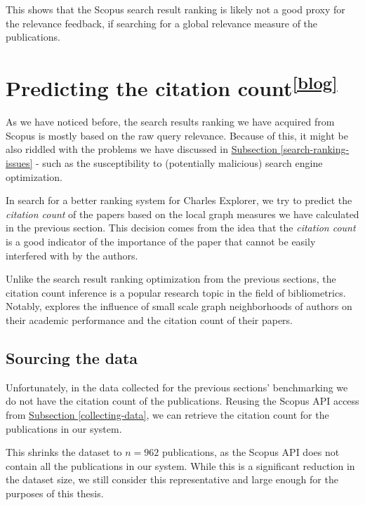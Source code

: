 This shows that the Scopus search result ranking is likely not a good proxy for the relevance feedback,
if searching for a global relevance measure of the publications.

\section[Predicting the citation count]{Predicting the citation count\textsuperscript{\href{https://jindrich.bar/edu/thesis-blog/citation-count/}{[blog]}}}

As we have noticed before, the search results ranking we have acquired from Scopus is mostly based on the raw query relevance. 
Because of this, it might be also riddled with the problems we have discussed in \hyperref[search-ranking-issues]{Subsection \ref*{search-ranking-issues}} - 
such as the susceptibility to (potentially malicious) search engine optimization.

In search for a better ranking system for Charles Explorer, we try to predict the \textit{citation count} of the papers based on the local graph measures we have calculated in the previous section. 
This decision comes from the idea that the \textit{citation count} is a good indicator of the importance of the paper that cannot be easily interfered with by the authors.

Unlike the search result ranking optimization from the previous sections, the citation count inference is a popular research topic in the field of bibliometrics.
Notably, \cite{ABBASI2011594} explores the influence of small scale graph neighborhoods of authors on their academic performance and the citation count of their papers.

\subsection{Sourcing the data}

Unfortunately, in the data collected for the previous sections' benchmarking we do not have the citation count of the publications.
Reusing the Scopus API access from \hyperref[collecting-data]{Subsection \ref*{collecting-data}}, we can retrieve the citation count for the publications in our system.

This shrinks the dataset to $n = 962$ publications, as the Scopus API does not contain all the publications in our system.
While this is a significant reduction in the dataset size, we still consider this representative and large enough for the purposes of this thesis.


